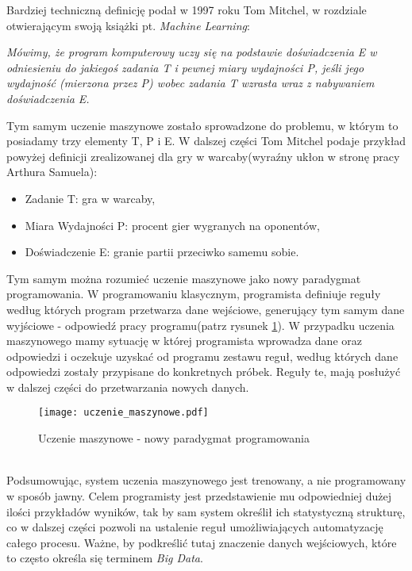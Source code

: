 Bardziej techniczną definicję podał w 1997 roku Tom Mitchel, w rozdziale otwierającym swoją książki pt. \textit{Machine Learning}:
\begin{center}
	\textit{Mówimy, że program komputerowy uczy się na podstawie doświadczenia E w 	odniesieniu do jakiegoś zadania T i pewnej miary wydajności P, jeśli jego wydajność (mierzona przez P) wobec zadania T wzrasta wraz z nabywaniem doświadczenia E.}\cite{mitchell}
\end{center}
Tym samym uczenie maszynowe zostało sprowadzone do problemu, w którym to posiadamy trzy elementy T, P i E. W dalszej części Tom Mitchel podaje przykład powyżej definicji zrealizowanej dla gry w warcaby(wyraźny ukłon w stronę pracy Arthura Samuela\cite{samuel}):
\begin{itemize}
	\item Zadanie T: gra w warcaby,
	\item Miara Wydajności P: procent gier wygranych na oponentów,
	\item Doświadczenie E: granie partii przeciwko samemu sobie.\\
\end{itemize}

Tym samym można rozumieć uczenie maszynowe jako nowy paradygmat programowania. W programowaniu klasycznym, programista definiuje reguły według których program przetwarza dane wejściowe, generujący tym samym dane wyjściowe - odpowiedź pracy programu(patrz rysunek \ref{fig:uczenie_maszynowe}). W przypadku uczenia maszynowego mamy sytuację w której programista wprowadza dane oraz odpowiedzi i oczekuje uzyskać od programu zestawu reguł, według których dane odpowiedzi zostały przypisane do konkretnych próbek. Reguły te, mają posłużyć w dalszej części do przetwarzania nowych danych.
\begin{figure}[h!]
	\texttt{[image: uczenie\_maszynowe.pdf]}
	\centering
	\caption{Uczenie maszynowe - nowy paradygmat programowania}
	\label{fig:uczenie_maszynowe}
\end{figure}
\\

Podsumowując, system uczenia maszynowego jest trenowany, a nie programowany w sposób jawny. Celem programisty jest przedstawienie mu odpowiedniej dużej ilości przykładów wyników, tak by sam system określił ich statystyczną strukturę, co w dalszej części pozwoli na ustalenie reguł umożliwiających automatyzację całego procesu. Ważne, by podkreślić tutaj znaczenie danych wejściowych, które to często określa się terminem \textit{Big Data}\cite{big_data}.

